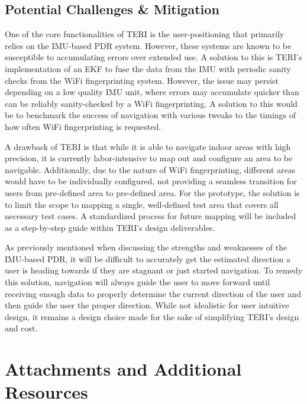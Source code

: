 \documentclass{article}
\begin{document}
\subsection{Potential Challenges \& Mitigation}
One of the core functionalities of TERI is the user-positioning that primarily relies on the IMU-based PDR system. However, these systems are known to be susceptible to accumulating errors over extended use. A solution to this is TERI's implementation of an EKF to fuse the data from the IMU with periodic sanity checks from the WiFi fingerprinting system. However, the issue may persist depending on a low quality IMU unit, where errors may accumulate quicker than can be reliably sanity-checked by a WiFi fingerprinting. A solution to this would be to benchmark the success of navigation with various tweaks to the timings of how often WiFi fingerprinting is requested.

A drawback of TERI is that while it is able to navigate indoor areas with high precision, it is currently labor-intensive to map out and configure an area to be navigable. Additionally, due to the nature of WiFi fingerprinting, different areas would have to be individually configured, not providing a seamless transition for users from pre-defined area to pre-defined area. For the prototype, the solution is to limit the scope to mapping a single, well-defined test area that covers all necessary test cases. A standardized process for future mapping will be included as a step-by-step guide within TERI's design deliverables.

As previously mentioned when discussing the strengths and weaknesses of the IMU-based PDR, it will be difficult to accurately get the estimated direction a user is heading towards if they are stagnant or just started navigation. To remedy this solution, navigation will always guide the user to move forward until receiving enough data to properly determine the current direction of the user and then guide the user the proper direction. While not idealistic for user intuitive design, it remains a design choice made for the sake of simplifying TERI's design and cost.

\section{Attachments and Additional Resources}
\end{document}
